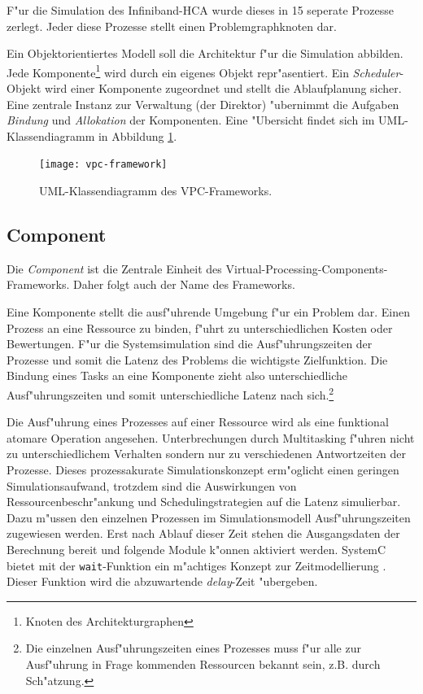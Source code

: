 F"ur die Simulation des Infiniband-HCA wurde dieses in 15 seperate Prozesse 
zerlegt. Jeder diese Prozesse stellt einen Problemgraphknoten dar.

Ein Objektorientiertes Modell soll die Architektur f"ur die Simulation
  abbilden. Jede Komponente\footnote{Knoten des
  Architekturgraphen} wird durch ein eigenes Objekt repr"asentiert. Ein
  \emph{Scheduler}-Objekt wird einer Komponente zugeordnet und stellt die
  Ablaufplanung sicher. Eine zentrale Instanz zur Verwaltung (der Direktor)
  "ubernimmt die Aufgaben \emph{Bindung} und \emph{Allokation} der 
Komponenten. Eine
"Ubersicht findet sich im UML-Klassendiagramm in Abbildung
\ref{fig:vpcframework}.
\begin{figure}
\begin{center}
\texttt{[image: vpc-framework]}
\caption{UML-Klassendiagramm des VPC-Frameworks.}
\label{fig:vpcframework}
\end{center}
\end{figure}
\subsection{Component}
Die \emph{Component} ist die Zentrale Einheit des
Virtual-Processing-Components-Frameworks. Daher folgt auch der Name des
Frameworks. 


Eine Komponente stellt die ausf"uhrende Umgebung f"ur ein Problem dar. Einen
Prozess an eine Ressource zu binden, f"uhrt zu unterschiedlichen Kosten oder
Bewertungen. F"ur die Systemsimulation sind
die Ausf"uhrungszeiten der Prozesse und somit die Latenz des Problems die
wichtigste Zielfunktion. Die Bindung eines Tasks an eine Komponente zieht also
unterschiedliche Ausf"uhrungszeiten und somit unterschiedliche Latenz nach 
sich.\footnote{Die einzelnen Ausf"uhrungszeiten eines Prozesses muss f"ur alle 
zur Ausf"uhrung in Frage kommenden Ressourcen bekannt sein, 
z.B. durch Sch"atzung.}

Die Ausf"uhrung eines Prozesses auf einer Ressource wird als eine funktional 
atomare Operation angesehen. Unterbrechungen durch Multitasking f"uhren nicht
zu unterschiedlichem Verhalten sondern nur zu verschiedenen Antwortzeiten der 
Prozesse. Dieses prozessakurate Simulationskonzept erm"oglicht einen geringen 
Simulationsaufwand, trotzdem sind die Auswirkungen von Ressourcenbeschr"ankung 
und Schedulingstrategien auf die Latenz simulierbar. Dazu m"ussen den einzelnen 
Prozessen im Simulationsmodell Ausf"uhrungszeiten zugewiesen
werden. Erst nach Ablauf dieser Zeit stehen die Ausgangsdaten der Berechnung
bereit und folgende Module k"onnen aktiviert werden. SystemC bietet mit 
der \verb|wait|-Funktion ein m"achtiges Konzept zur Zeitmodellierung 
\cite{glms:2002}. Dieser Funktion wird die abzuwartende \emph{delay}-Zeit
"ubergeben. 


